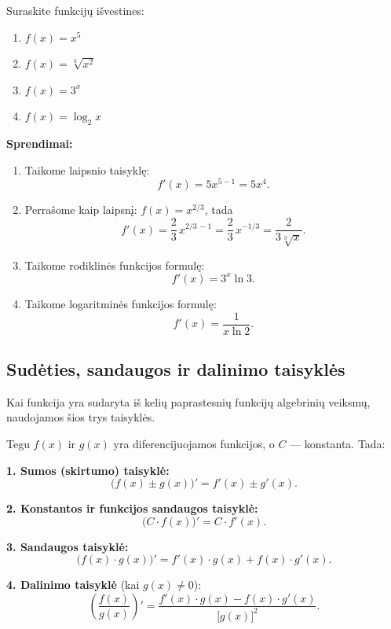 \begin{example}
Suraskite funkcijų išvestines:
\begin{enumerate}[label=\alph*)]
    \item $f(x) = x^5$
    \item $f(x) = \sqrt[3]{x^2}$
    \item $f(x) = 3^x$
    \item $f(x) = \log_2 x$
\end{enumerate}

\textbf{Sprendimai:}
\begin{enumerate}[label=\alph*)]
    \item Taikome laipsnio taisyklę:
    \[
        f'(x) = 5x^{5-1} = 5x^4.
    \]
    \item Perrašome kaip laipsnį: $f(x) = x^{2/3}$, tada
    \[
        f'(x) = \frac{2}{3}\,x^{2/3\,-1} = \frac{2}{3}\,x^{-1/3} = \frac{2}{3\sqrt[3]{x}}.
    \]
    \item Taikome rodiklinės funkcijos formulę:
    \[
        f'(x) = 3^x \ln 3.
    \]
    \item Taikome logaritminės funkcijos formulę:
    \[
        f'(x) = \frac{1}{x \ln 2}.
    \]
\end{enumerate}
\end{example}

\subsection{Sudėties, sandaugos ir dalinimo taisyklės}

Kai funkcija yra sudaryta iš kelių paprastesnių funkcijų algebrinių veiksmų,
naudojamos šios trys taisyklės.

\begin{tcolorbox}[title={Skaičiavimo taisyklės}, colback=green!5, colframe=green!40!black]
Tegu $f(x)$ ir $g(x)$ yra diferencijuojamos funkcijos, o $C$ --- konstanta. Tada:

\medskip
\textbf{1. Sumos (skirtumo) taisyklė:}
\[
    \bigl(f(x) \pm g(x)\bigr)' = f'(x) \pm g'(x).
\]

\textbf{2. Konstantos ir funkcijos sandaugos taisyklė:}
\[
    \bigl(C \cdot f(x)\bigr)' = C \cdot f'(x).
\]

\textbf{3. Sandaugos taisyklė:}
\[
    \bigl(f(x) \cdot g(x)\bigr)' = f'(x)\cdot g(x) + f(x)\cdot g'(x).
\]

\textbf{4. Dalinimo taisyklė} (kai $g(x)\neq 0$):
\[
    \left(\frac{f(x)}{g(x)}\right)' = \frac{f'(x)\cdot g(x) - f(x)\cdot g'(x)}{\bigl[g(x)\bigr]^2}.
\]
\end{tcolorbox}

